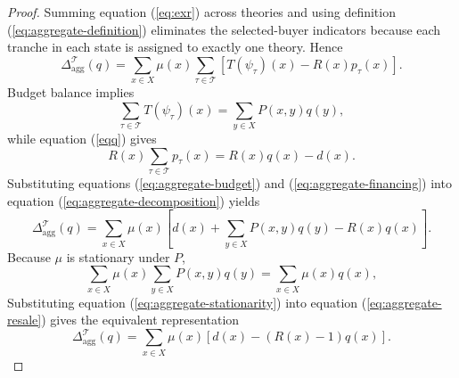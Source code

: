 \documentclass[11pt]{article}
\theoremstyle{plain}
\begin{document}
\begin{proof}
Summing equation (\ref{eq:exr}) across theories and using definition (\ref{eq:aggregate-definition}) eliminates the selected-buyer indicators because each tranche in each state is assigned to exactly one theory. Hence
\begin{equation}\label{eq:aggregate-decomposition}
\Delta_{\mathrm{agg}}^{\mathcal{T}}(q)
=
\sum_{x\in X}\mu(x)
\sum_{\tau\in\mathcal{T}}
\left[
T(\psi_\tau)(x)-R(x)p_\tau(x)
\right].
\end{equation}
Budget balance implies
\begin{equation}\label{eq:aggregate-budget}
\sum_{\tau\in\mathcal{T}}T(\psi_\tau)(x)
=
\sum_{y\in X}P(x,y)q(y),
\end{equation}
while equation (\ref{eqq}) gives
\begin{equation}\label{eq:aggregate-financing}
R(x)\sum_{\tau\in\mathcal{T}}p_\tau(x)
=R(x)q(x)-d(x).
\end{equation}
Substituting equations (\ref{eq:aggregate-budget}) and (\ref{eq:aggregate-financing}) into equation (\ref{eq:aggregate-decomposition}) yields
\begin{equation}\label{eq:aggregate-resale}
\Delta_{\mathrm{agg}}^{\mathcal{T}}(q)
=
\sum_{x\in X}\mu(x)
\left[
d(x)
+\sum_{y\in X}P(x,y)q(y)
-R(x)q(x)
\right].
\end{equation}
Because $\mu$ is stationary under $P$,
\begin{equation}\label{eq:aggregate-stationarity}
\sum_{x\in X}\mu(x)
\sum_{y\in X}P(x,y)q(y)
=
\sum_{x\in X}\mu(x)q(x),
\end{equation}
Substituting equation (\ref{eq:aggregate-stationarity}) into equation (\ref{eq:aggregate-resale}) gives the equivalent representation
\begin{equation}\label{eq:aggregate-compact}
\Delta_{\mathrm{agg}}^{\mathcal{T}}(q)
=
\sum_{x\in X}\mu(x)
\left[d(x)-(R(x)-1)q(x)\right].
\end{equation}


\end{proof}
\end{document}

